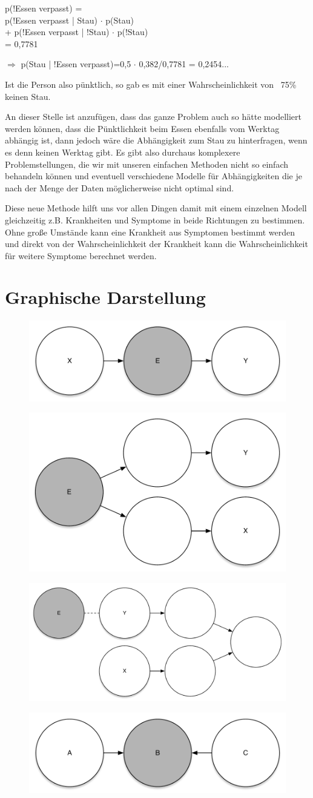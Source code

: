 p(!Essen verpasst) =\\
p(!Essen verpasst | Stau) $\cdot$ p(Stau)\\ + p(!Essen verpasst | !Stau) $\cdot$ p(!Stau)\\ = 0,7781

$\Rightarrow$ p(Stau | !Essen verpasst)=0,5 $\cdot$ 0,382/0,7781 = 0,2454...

Ist die Person also pünktlich, so gab es mit einer Wahrscheinlichkeit von ~75\% keinen Stau.

An dieser Stelle ist anzufügen, dass das ganze Problem auch so hätte modelliert werden können, dass die Pünktlichkeit beim Essen ebenfalls vom Werktag abhängig ist, dann jedoch wäre die Abhängigkeit zum Stau zu hinterfragen, wenn es denn keinen Werktag gibt.
Es gibt also durchaus komplexere Problemstellungen, die wir mit unseren einfachen Methoden nicht so einfach behandeln können und eventuell verschiedene Modelle für Abhängigkeiten die je nach der Menge der Daten möglicherweise nicht optimal sind.

Diese neue Methode hilft uns vor allen Dingen damit mit einem einzelnen Modell gleichzeitig z.B. Krankheiten und Symptome in beide Richtungen zu bestimmen. Ohne große Umstände kann eine Krankheit aus Symptomen bestimmt werden und direkt von der Wahrscheinlichkeit der Krankheit kann die Wahrscheinlichkeit für weitere Symptome berechnet werden.

\section{Graphische Darstellung}
\begin{figure}[h]
    \centering
    \includegraphics[width=.2\textwidth]{chapters/bayes/bayes_net_1.pdf}
\end{figure}
\begin{figure}[h]
    \centering
    \includegraphics[width=.2\textwidth]{chapters/bayes/bayes_net_2.pdf}
\end{figure}
\begin{figure}[h]
    \centering
    \includegraphics[width=.2\textwidth]{chapters/bayes/bayes_net_3.pdf}
\end{figure}
\begin{figure}[h]
    \centering
    \includegraphics[width=.2\textwidth]{chapters/bayes/bayes_net_4.pdf}
\end{figure}

